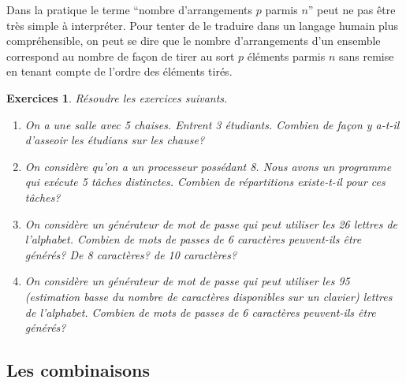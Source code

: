 \documentclass[a4paper,12pt]{book}
\newtheorem*{exercices}{Exercices}
\begin{document}
Dans la pratique le terme ``nombre d'arrangements $p$ parmis $n$'' peut ne pas être très simple à interpréter. Pour tenter de le traduire
dans un langage humain plus compréhensible, on peut se dire que le nombre d'arrangements d'un ensemble correspond au nombre de façon de tirer au sort $p$ éléments parmis $n$
sans remise en tenant compte de l'ordre des éléments tirés.
\begin{exercices}
 Résoudre les exercices suivants.
 \begin{enumerate}
  \item On a une salle avec 5 chaises. Entrent 3 étudiants. Combien de façon y a-t-il 
  d'asseoir les étudians sur les chause?
  \item On considère qu'on a un processeur possédant 8. Nous avons un programme qui 
  exécute 5 tâches distinctes. Combien de répartitions existe-t-il pour ces tâches?
  \item On considère un générateur de mot de passe qui peut utiliser les 26 lettres de l'alphabet. Combien de mots de passes de 6 caractères peuvent-ils être générés?  De 8 caractères? de 10 caractères?
  \item On considère un générateur de mot de passe qui peut utiliser les 95 (estimation basse du nombre de caractères disponibles sur un clavier) lettres de l'alphabet. Combien de mots de passes de 6 caractères peuvent-ils être générés?
 \end{enumerate}

\end{exercices}

\subsection{Les combinaisons}
\end{document}

